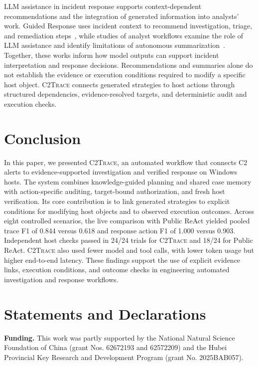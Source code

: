 \documentclass[pdflatex,sn-basic]{sn-jnl}
\newcommand{\system}{\textsc{C2Trace}\xspace}
\begin{document}
LLM assistance in incident response supports context-dependent recommendations and the integration of generated information into analysts' work. Guided Response uses incident context to recommend investigation, triage, and remediation steps~\citep{guided-response2025}, while studies of analyst workflows examine the role of LLM assistance and identify limitations of autonomous summarization~\citep{kramer2025}. Together, these works inform how model outputs can support incident interpretation and response decisions. Recommendations and summaries alone do not establish the evidence or execution conditions required to modify a specific host object. \system connects generated strategies to host actions through structured dependencies, evidence-resolved targets, and deterministic audit and execution checks.

\section{Conclusion}
\label{sec:conclusion}

In this paper, we presented \system, an automated workflow that connects C2 alerts to evidence-supported investigation and verified response on Windows hosts. The system combines knowledge-guided planning and shared case memory with action-specific auditing, target-bound authorization, and fresh host verification. Its core contribution is to link generated strategies to explicit conditions for modifying host objects and to observed execution outcomes. Across eight controlled scenarios, the live comparison with Public ReAct yielded pooled trace F1 of 0.844 versus 0.618 and response action F1 of 1.000 versus 0.903. Independent host checks passed in 24/24 trials for \system and 18/24 for Public ReAct. \system also used fewer model and tool calls, with lower token usage but higher end-to-end latency. These findings support the use of explicit evidence links, execution conditions, and outcome checks in engineering automated investigation and response workflows.

\backmatter
\section*{Statements and Declarations}

\noindent\textbf{Funding.}
This work was partly supported by the National Natural Science Foundation of China (grant Nos. 62672193 and 62572209) and the Hubei Provincial Key Research and Development Program (grant No. 2025BAB057).
\end{document}
